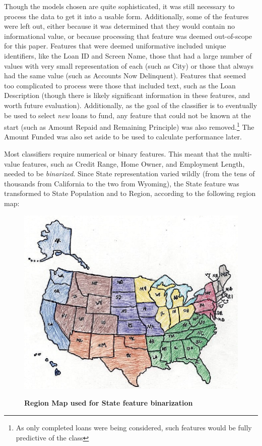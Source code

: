 Though the models chosen are quite sophisticated, it was still necessary to process the data to get it into a usable form. 
Additionally, some of the features were left out, either because it was determined that they would contain no informational 
value, or because processing that feature was deemed out-of-scope for this paper. Features that were deemed uniformative 
included unique identifiers, like the Loan ID and Screen Name, those that had a large number of values with very small representation of 
each (such as City) or those that always had the same value (such as Accounts Now Delinquent). Features that seemed too complicated 
to process were those that included text, such as the Loan Description (though there is likely significant information in these 
features, and worth future evaluation). Additionally, as the goal of the classifier is to eventually be used to select 
\emph{new} loans to fund, any feature that could not be known at the start (such as Amount Repaid and Remaining 
Principle) was also removed.\footnote{As only completed loans were being considered, such features would be fully 
predictive of the class} The Amount Funded was also set aside to be used to calculate performance later.

Most classifiers require numerical or binary features. This meant that the multi-value features, such as Credit Range, Home 
Owner, and Employment Length, needed to be \emph{binarized}. Since State representation varied wildly (from the tens of thousands
from California to the two from Wyoming), the State feature was transformed to State Population and to Region, according to 
the following region map:
\begin{figure}[h]
    \centering
    \includegraphics[scale=0.5]{figs/map.eps}
    \label{fig:map}
    \caption{\textbf{Region Map used for State feature binarization}}
\end{figure}

